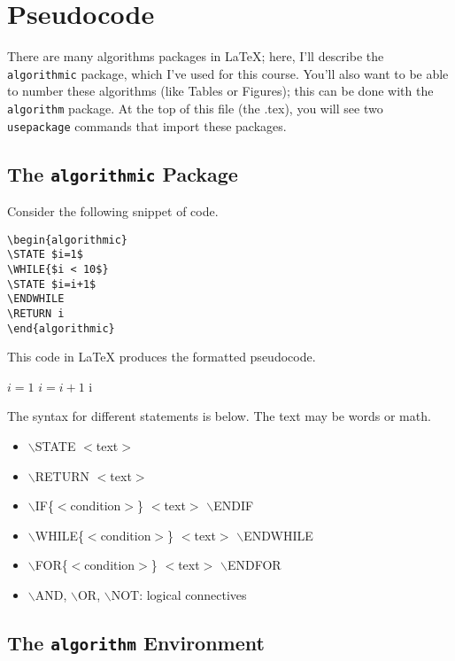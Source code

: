 \documentclass{sig-alternate-05-2015}
\begin{document}
\section{Pseudocode}

There are many algorithms packages in LaTeX; here, I'll describe the \texttt{algorithmic} package, which I've used for this course.  You'll also want to be able to number these algorithms (like Tables or Figures); this can be done with the \texttt{algorithm} package.  At the top of this file (the .tex), you will see two \texttt{\\usepackage} commands that import these packages.

\subsection{The \texttt{algorithmic} Package}

Consider the following snippet of code.

\begin{verbatim}
\begin{algorithmic}
\STATE $i=1$
\WHILE{$i < 10$}
\STATE $i=i+1$
\ENDWHILE
\RETURN i
\end{algorithmic}
\end{verbatim}

\noindent This code in LaTeX produces the formatted pseudocode.

\begin{algorithmic}
\STATE $i=1$
\STATE $i=i+1$
\ENDWHILE
\RETURN i
\end{algorithmic}
\vspace{.2in}

\noindent The syntax for different statements is below.  The text may be words or math.
\begin{itemize}
\item $\backslash$STATE $<$text$>$
\item $\backslash$RETURN $<$text$>$
\item $\backslash$IF\{$<$condition$>$\} $<$text$>$ $\backslash$ENDIF
\item $\backslash$WHILE\{$<$condition$>$\} $<$text$>$ $\backslash$ENDWHILE
\item $\backslash$FOR\{$<$condition$>$\} $<$text$>$ $\backslash$ENDFOR
\item $\backslash$AND, $\backslash$OR, $\backslash$NOT: logical connectives
\end{itemize}

\subsection{The \texttt{algorithm} Environment}
\end{document}
